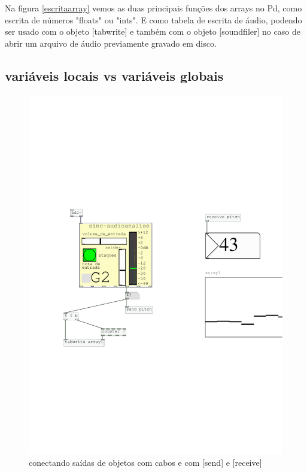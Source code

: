 \documentclass[draft]{ppgmus}
\begin{document}
Na figura \ref{escritaarray} vemos as duas principais funções dos arrays
no Pd, como escrita de números "floats" ou "ints". E como tabela de escrita
de áudio, podendo ser usado com o objeto [tabwrite\texttildelow] e também
com o objeto [soundfiler] no caso de abrir um arquivo de áudio previamente
gravado em disco.







\subsection{variáveis locais vs variáveis globais}

\begin{figure}
\includegraphics[scale=.6]{ex-conexoes}
\caption{conectando saídas de objetos com cabos e com [send] e [receive]}
\label{ex-conexoes}
\end{figure}
\end{document}
